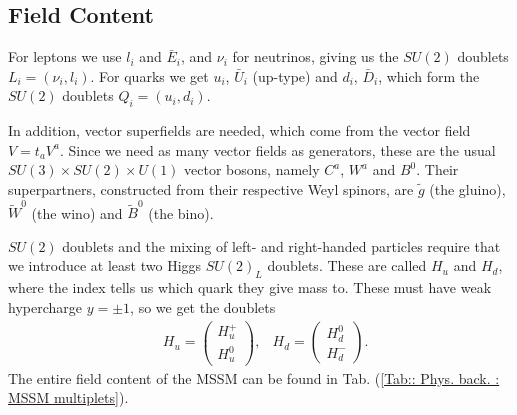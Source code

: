 \documentclass[twoside,english]{uiofysmaster}
\begin{document}
\subsection{Field Content}

For leptons we use $l_i$ and $\bar{E}_i$, and $\nu_i$ for neutrinos, giving us the $SU(2)$ doublets $L_i = (\nu_i, l_i)$. For quarks we get $u_i$, $\bar{U}_i$ (up-type) and $d_i$, $\bar{D}_i$, which form the $SU(2)$ doublets $Q_i = (u_i, d_i)$.

In addition, vector superfields are needed, which come from the vector field $V = t_aV^a$. Since we need as many vector fields as generators, these are the usual $SU(3) \times SU(2) \times U(1)$ vector bosons, namely $C^a$, $W^a$ and $B^0$. Their superpartners, constructed from their respective Weyl spinors, are $\tilde{g}$ (the gluino), $\tilde{W}^0$ (the wino) and $\tilde{B}^0$ (the bino).

$SU(2)$ doublets and the mixing of left- and right-handed particles require that we introduce at least two Higgs $SU(2)_L$ doublets. These are called $H_u$ and $H_d$, where the index tells us which quark they give mass to. These must have weak hypercharge $y = \pm 1$, so we get the doublets
\begin{align}
&H_u = \begin{pmatrix}
H_u^+\\
H_u^0
\end{pmatrix},
&H_d = \begin{pmatrix}
H_d^0\\
H_d^-
\end{pmatrix}.
\end{align}  
The entire field content of the MSSM can be found in Tab. (\ref{Tab:: Phys. back. : MSSM multiplets}). %
\end{document}
